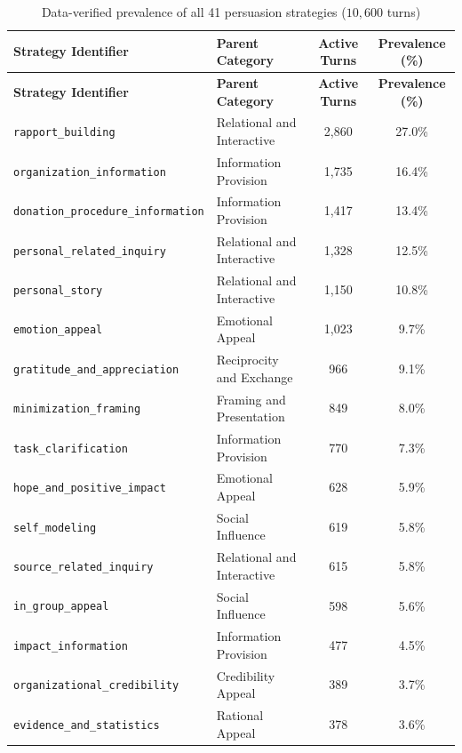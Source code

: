 \begin{longtable}{llcc}
  \caption{Data-verified prevalence of all 41 persuasion strategies ($10{,}600$ turns)} \label{tab:app-full-strategy-prevalence} \\
  \toprule
  \textbf{Strategy Identifier} & \textbf{Parent Category} & \textbf{Active Turns} & \textbf{Prevalence (\%)} \\
  \midrule
  \endfirsthead
  \toprule
  \textbf{Strategy Identifier} & \textbf{Parent Category} & \textbf{Active Turns} & \textbf{Prevalence (\%)} \\
  \midrule
  \endhead
  \bottomrule
  \endfoot
  \texttt{rapport\_building} & Relational and Interactive & 2,860 & 27.0\% \\
  \rowcolor{lightbg}
  \texttt{organization\_information} & Information Provision & 1,735 & 16.4\% \\
  \texttt{donation\_procedure\_information} & Information Provision & 1,417 & 13.4\% \\
  \rowcolor{lightbg}
  \texttt{personal\_related\_inquiry} & Relational and Interactive & 1,328 & 12.5\% \\
  \texttt{personal\_story} & Relational and Interactive & 1,150 & 10.8\% \\
  \rowcolor{lightbg}
  \texttt{emotion\_appeal} & Emotional Appeal & 1,023 & 9.7\% \\
  \texttt{gratitude\_and\_appreciation} & Reciprocity and Exchange & 966 & 9.1\% \\
  \rowcolor{lightbg}
  \texttt{minimization\_framing} & Framing and Presentation & 849 & 8.0\% \\
  \texttt{task\_clarification} & Information Provision & 770 & 7.3\% \\
  \rowcolor{lightbg}
  \texttt{hope\_and\_positive\_impact} & Emotional Appeal & 628 & 5.9\% \\
  \texttt{self\_modeling} & Social Influence & 619 & 5.8\% \\
  \rowcolor{lightbg}
  \texttt{source\_related\_inquiry} & Relational and Interactive & 615 & 5.8\% \\
  \texttt{in\_group\_appeal} & Social Influence & 598 & 5.6\% \\
  \rowcolor{lightbg}
  \texttt{impact\_information} & Information Provision & 477 & 4.5\% \\
  \texttt{organizational\_credibility} & Credibility Appeal & 389 & 3.7\% \\
  \rowcolor{lightbg}
  \texttt{evidence\_and\_statistics} & Rational Appeal & 378 & 3.6\% \\

\end{longtable}
